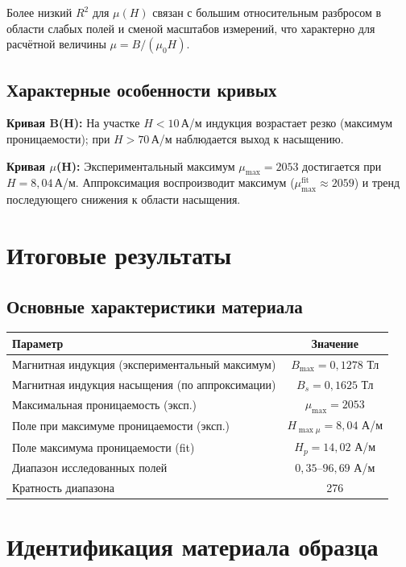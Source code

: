 \documentclass[a4paper,14pt]{article}
\begin{document}
Более низкий $R^2$ для $\mu(H)$ связан с большим относительным разбросом в области слабых полей и сменой масштабов измерений, что характерно для расчётной величины $\mu = B/(\mu_0H)$.

\subsection{Характерные особенности кривых}

\textbf{Кривая B(H):} На участке $H < 10$\,А/м индукция возрастает резко (максимум проницаемости); при $H > 70$\,А/м наблюдается выход к насыщению.

\textbf{Кривая $\mu$(H):} Экспериментальный максимум $\mu_{\max} = 2053$ достигается при $H = 8{,}04$\,А/м. Аппроксимация воспроизводит максимум ($\mu_{\max}^{\text{fit}}\approx2059$) и тренд последующего снижения к области насыщения.

\section{Итоговые результаты}

\subsection*{Основные характеристики материала}

\begin{table}[H]
\centering
\small
\begin{tabular}{|l|c|}
\hline
Параметр & Значение \\
\hline
Магнитная индукция (экспериментальный максимум) & $B_{\max} = 0{,}1278$ Тл \\
Магнитная индукция насыщения (по аппроксимации) & $B_s = 0{,}1625$ Тл \\
Максимальная проницаемость (эксп.) & $\mu_{\max} = 2053$ \\
Поле при максимуме проницаемости (эксп.) & $H_{\max\mu} = 8{,}04$ А/м \\
Поле максимума проницаемости (fit) & $H_p = 14{,}02$ А/м \\
Диапазон исследованных полей & $0{,}35$--$96{,}69$ А/м \\
Кратность диапазона & 276 \\
\hline
\end{tabular}
\end{table}

\section{Идентификация материала образца}
\end{document}

